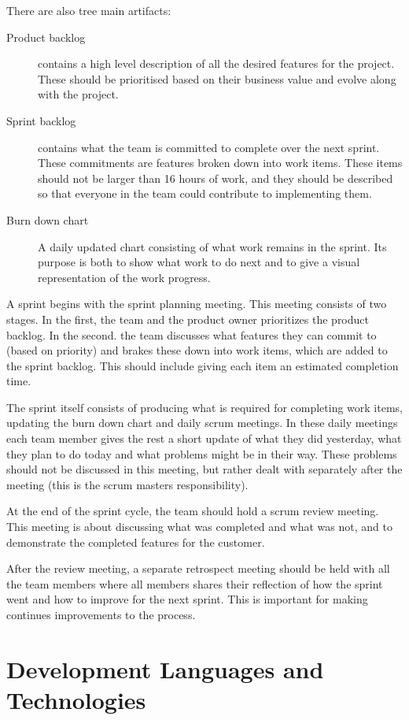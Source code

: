 \noindent There are also tree main artifacts:
\begin{description}
	\item[Product backlog] contains a high level description of all the desired
		features for the project. These should be prioritised based on their
		business value and evolve along with the project.
	\item[Sprint backlog] contains what the team is committed to complete over
		the next sprint. These commitments are features broken down into work
		items. These items should not be larger than 16 hours of work, and they
		should be described so that everyone in the team could contribute to
		implementing them.
	\item[Burn down chart] A daily updated chart consisting of what work
		remains in the sprint. Its purpose is both to show what work to do next
		and to give a visual representation of the work progress.
\end{description}

A sprint begins with the sprint planning meeting. This meeting consists of two
stages. In the first, the team and the product owner prioritizes the product
backlog. In the second. the team discusses what features they can commit to
(based on priority) and brakes these down into work items, which are added to
the sprint backlog. This should include giving each item an estimated
completion time.

The sprint itself consists of producing what is required for completing work
items, updating the burn down chart and daily scrum meetings. In these daily
meetings each team member gives the rest a short update of what they did
yesterday, what they plan to do today and what problems might be in their way.
These problems should not be discussed in this meeting, but rather dealt with
separately after the meeting (this is the scrum masters responsibility).

At the end of the sprint cycle, the team should hold a scrum review meeting.
This meeting is about discussing what was completed and what was not, and to
demonstrate the completed features for the customer.

After the review meeting, a separate retrospect meeting should be held with all
the team members where all members shares their reflection of how the sprint
went and how to improve for the next sprint. This is important for making
continues improvements to the process.

\section{Development Languages and Technologies}

